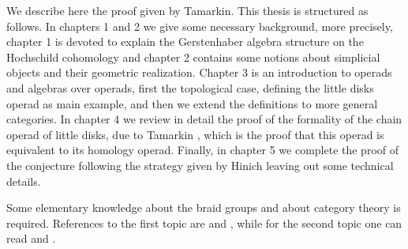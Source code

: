 \documentclass[TFM.tex]{subfiles}
\begin{document}
We describe here the proof given by Tamarkin. This thesis is structured as follows. In chapters 1 and 2 we give some necessary background, more precisely, chapter 1 is devoted to explain the Gerstenhaber algebra structure on the Hochschild cohomology and chapter 2 contains some notions about simplicial objects and their geometric realization. Chapter 3 is an introduction to operads and algebras over operads, first the topological case, defining the little disks operad as main example, and then we extend the definitions to more general categories. In chapter 4 we review in detail the proof of the formality of the chain operad of little disks, due to Tamarkin \cite{Tamarkin}, which is the proof that this operad is equivalent to its homology operad. Finally, in chapter 5 we complete the proof of the conjecture following the strategy given by Hinich \cite{Hinich} leaving out some technical details. 

Some elementary knowledge about the braid groups and about category theory is required. References to the first topic are \cite{tfg} and \cite{Meneses}, while for the second topic one can read \cite{working} and \cite{Diego}.




%
%
%
%
\end{document}
